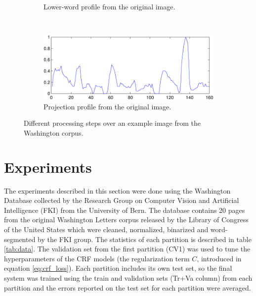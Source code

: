 \documentclass[10pt,a4paper]{article}
\begin{document}
\begin{figure}[h]
\begin{subfigure}[b]{0.45\textwidth}
\caption{Lower-word profile from the original image.}
\label{fig:img_features_lower}
\end{subfigure}\\
\begin{subfigure}[b]{0.45\textwidth}
\centering
\includegraphics[width=\textwidth]{imgs/and_projection-crop.pdf}
\caption{Projection profile from the original image.}
\label{fig:img_features_project}
\end{subfigure}
\caption{Different processing steps over an example image from the Washington corpus\cite{fischer2012lexicon}.}
\label{fig:img_features}
\end{figure}

\section{Experiments}
The experiments described in this section were done using the Washington Database collected by the Research Group on Computer Vision and Artificial Intelligence (FKI) from the University of Bern\cite{fischer2012lexicon}. The database contains 20 pages from the original Washington Letters corpus released by the Library of Congress of the United States which were cleaned, normalized, binarized and word-segmented by the FKI group. The statistics of each partition is described in table \ref{tab:data}. The validation set from the first partition (CV1) was used to tune the hyperparameters of the CRF models (the regularization term $C$, introduced in equation \ref{eq:crf_loss}). Each partition includes its own test set, so the final system was trained using the train and validation sets (Tr+Va column) from each partition and the errors reported on the test set for each partition were averaged.\\
\end{document}
